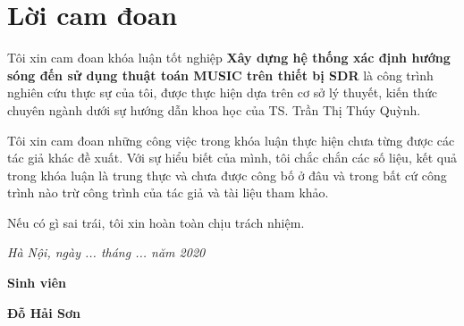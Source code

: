 \chapter*{Lời cam đoan}

Tôi xin cam đoan khóa luận tốt nghiệp \textbf{Xây dựng hệ thống xác định hướng sóng đến sử dụng thuật toán MUSIC trên thiết bị SDR} là công trình nghiên cứu thực sự của tôi, được thực hiện dựa trên cơ sở lý thuyết, kiến thức chuyên ngành dưới sự hướng dẫn khoa học của TS. Trần Thị Thúy Quỳnh.

Tôi xin cam đoan những công việc trong khóa luận thực hiện chưa từng được các tác giả khác đề xuất. Với sự hiểu biết của mình, tôi chắc chắn các số liệu, kết quả trong khóa luận là trung thực và chưa được công bố ở đâu và trong bất cứ công trình nào trừ công trình của tác giả và tài liệu tham khảo.

Nếu có gì sai trái, tôi xin hoàn toàn chịu trách nhiệm.
\vspace{1cm}

\indent \indent \indent \indent \indent \indent \indent \indent \textit{Hà Nội, ngày ... tháng ... năm 2020}

\indent \indent \indent \indent \indent \indent \indent \indent \indent \indent \hspace{0.5cm} \textbf{Sinh viên}
\vspace{1.5cm}

\indent \indent \indent \indent \indent \indent \indent \indent \indent \hspace{1.34cm} \textbf{Đỗ Hải Sơn}

